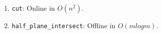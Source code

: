 \begin{enumerate}
\item \texttt{cut}: Online in $O(n^2)$.
\item \texttt{half\_plane\_intersect}: Offline in $O(mlogm)$.
\end{enumerate}


